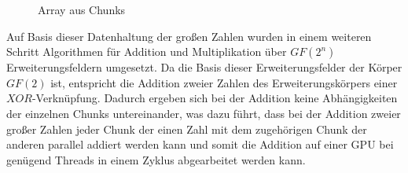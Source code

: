 {\begin{figure}
\centering

\caption{Array aus Chunks} \label{fig:chunk_array}
\end{figure}

Auf Basis dieser Datenhaltung der großen Zahlen wurden in einem weiteren Schritt Algorithmen für Addition und Multiplikation über $GF(2^n)$ Erweiterungsfeldern umgesetzt. Da die Basis dieser Erweiterungsfelder der Körper $GF(2)$ ist, entspricht die Addition zweier Zahlen des Erweiterungskörpers einer $XOR$-Verknüpfung. Dadurch ergeben sich bei der Addition keine Abhängigkeiten der einzelnen Chunks untereinander, was dazu führt, dass bei der Addition zweier großer Zahlen jeder Chunk der einen Zahl mit dem zugehörigen Chunk der anderen parallel addiert werden kann und somit die Addition auf einer GPU bei genügend Threads in einem Zyklus abgearbeitet werden kann.\newline

}
